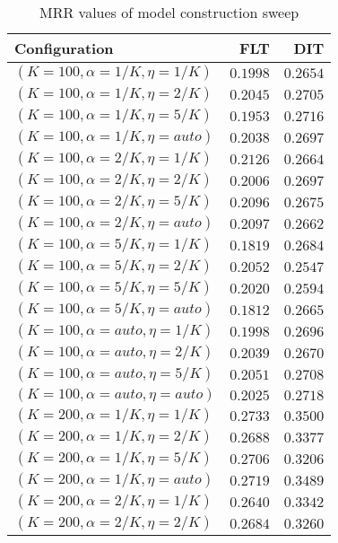 
\begin{table}
\begin{spacing}{1.2}
\centering
\caption{MRR values of \openjpa model construction sweep}
\label{table:openjpa_model_sweep}
\vspace{0.2em}
\parbox{.45\linewidth}{\centering \begin{tabular}{lrr}
\toprule
                   Configuration &      FLT &      DIT \\
\midrule
   $(K=100,\alpha=1/K,\eta=1/K)$ & $0.1998$ & $0.2654$ \\
   $(K=100,\alpha=1/K,\eta=2/K)$ & $0.2045$ & $0.2705$ \\
   $(K=100,\alpha=1/K,\eta=5/K)$ & $0.1953$ & $0.2716$ \\
  $(K=100,\alpha=1/K,\eta=auto)$ & $0.2038$ & $0.2697$ \\
   $(K=100,\alpha=2/K,\eta=1/K)$ & $0.2126$ & $0.2664$ \\
   $(K=100,\alpha=2/K,\eta=2/K)$ & $0.2006$ & $0.2697$ \\
   $(K=100,\alpha=2/K,\eta=5/K)$ & $0.2096$ & $0.2675$ \\
  $(K=100,\alpha=2/K,\eta=auto)$ & $0.2097$ & $0.2662$ \\
   $(K=100,\alpha=5/K,\eta=1/K)$ & $0.1819$ & $0.2684$ \\
   $(K=100,\alpha=5/K,\eta=2/K)$ & $0.2052$ & $0.2547$ \\
   $(K=100,\alpha=5/K,\eta=5/K)$ & $0.2020$ & $0.2594$ \\
  $(K=100,\alpha=5/K,\eta=auto)$ & $0.1812$ & $0.2665$ \\
  $(K=100,\alpha=auto,\eta=1/K)$ & $0.1998$ & $0.2696$ \\
  $(K=100,\alpha=auto,\eta=2/K)$ & $0.2039$ & $0.2670$ \\
  $(K=100,\alpha=auto,\eta=5/K)$ & $0.2051$ & $0.2708$ \\
 $(K=100,\alpha=auto,\eta=auto)$ & $0.2025$ & $0.2718$ \\
   $(K=200,\alpha=1/K,\eta=1/K)$ & $0.2733$ & $0.3500$ \\
   $(K=200,\alpha=1/K,\eta=2/K)$ & $0.2688$ & $0.3377$ \\
   $(K=200,\alpha=1/K,\eta=5/K)$ & $0.2706$ & $0.3206$ \\
  $(K=200,\alpha=1/K,\eta=auto)$ & $0.2719$ & $0.3489$ \\
   $(K=200,\alpha=2/K,\eta=1/K)$ & $0.2640$ & $0.3342$ \\
   $(K=200,\alpha=2/K,\eta=2/K)$ & $0.2684$ & $0.3260$ \\

\end{tabular}}
\end{spacing}
\end{table}
